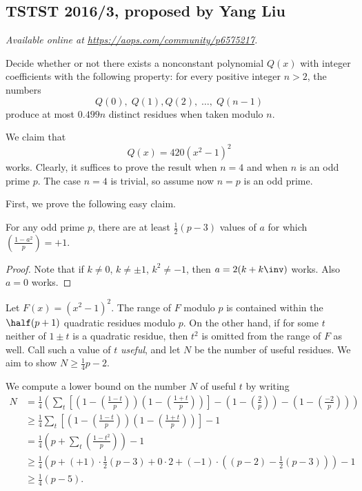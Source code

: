 \documentclass[11pt]{scrartcl}
\begin{document}
\subsection{TSTST 2016/3, proposed by Yang Liu}
\textsl{Available online at \url{https://aops.com/community/p6575217}.}
\begin{mdframed}[style=mdpurplebox,frametitle={Problem statement}]
Decide whether or not there exists a nonconstant polynomial $Q(x)$
with integer coefficients with the following property:
for every positive integer $n > 2$, the numbers
\[ Q(0), \; Q(1), Q(2),  \; \dots, \; Q(n-1) \]
produce at most $0.499n$ distinct residues when taken modulo $n$.
\end{mdframed}
We claim that
\[ Q(x) = 420(x^2-1)^2 \]
works.
Clearly, it suffices to prove the result when $n=4$ and when $n$ is an odd prime $p$.
The case $n=4$ is trivial, so assume now $n=p$ is an odd prime.

First, we prove the following easy claim.
\begin{claim*}
  For any odd prime $p$, there are at least $\frac12(p-3)$
  values of $a$ for which $\left( \frac{1-a^2}{p} \right) = +1$.
\end{claim*}
\begin{proof}
  Note that if $k \neq 0$, $k \neq \pm 1$, $k^2 \neq -1$, then $a = 2(k+k\inv)$ works.
  Also $a=0$ works.
\end{proof}

Let $F(x) = (x^2-1)^2$.
The range of $F$ modulo $p$ is contained within the $\half(p+1)$ quadratic residues modulo $p$.
On the other hand, if for some $t$ neither of $1 \pm t$ is a quadratic residue,
then $t^2$ is omitted from the range of $F$ as well.
Call such a value of $t$ \emph{useful}, and let $N$ be the number of useful residues.
We aim to show $N \ge \frac14 p - 2$.

We compute a lower bound on the number $N$ of useful $t$ by writing
\begin{align*}
  N &= \frac{1}{4} \left( \sum_t \left[ \left(1 - \left(\frac{1-t}{p} \right) \right)
    \left(1 - \left(\frac{1+t}{p} \right) \right) \right]
    - \left( 1- \left( \frac2p \right) \right)
    - \left( 1- \left( \frac{-2}p \right) \right)
  \right) \\
  &\ge \frac{1}{4} \sum_t \left[ \left(1 - \left(\frac{1-t}{p} \right) \right)
    \left(1 - \left(\frac{1+t}{p} \right) \right) \right] -1 \\
  &= \frac{1}{4} \left(p + \sum_t \left(\frac{1-t^2}{p} \right) \right) -1 \\
  &\ge \frac14 \left( p + (+1) \cdot \tfrac12(p-3) + 0 \cdot 2
    + (-1) \cdot ( (p-2) - \tfrac12(p-3)) \right) - 1 \\
  &\ge \frac14 \left( p - 5 \right).
\end{align*}
\end{document}
